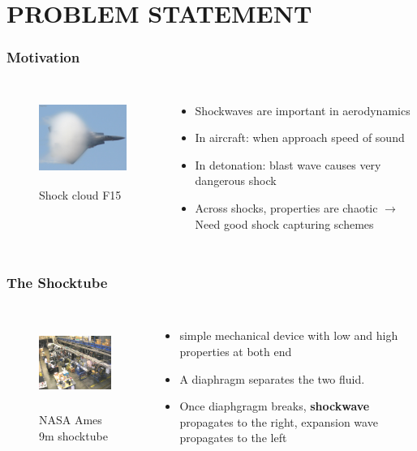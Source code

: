 \documentclass{beamer}
\begin{document}
    \section{PROBLEM STATEMENT}
    \begin{frame}
        \frametitle{Motivation}
        \begin{columns}
        \begin{figure}
            \includegraphics[height = 30mm,width = 50mm]{f15shock.JPG}
            \caption{Shock cloud F15}
        \end{figure}
        

        \begin{itemize}
            \item Shockwaves are important in aerodynamics
            \item In aircraft: when approach speed of sound 
            \item In detonation: blast wave causes very dangerous shock
            \item Across shocks, properties are chaotic $\rightarrow$ Need good shock capturing schemes            
        \end{itemize}
        \end{columns}        
    \end{frame}

    \begin{frame}
        \frametitle{The Shocktube}
        \begin{columns}
            \begin{figure}
                \includegraphics[height = 30mm,width = 50mm]{nasa_shocktube.png}
                \caption{NASA Ames 9m shocktube}
            \end{figure}
    
            \begin{itemize}
                \item simple mechanical device with low and high properties at both end
                \item A diaphragm separates the two fluid. 
                \item Once diaphgragm breaks, \textbf{shockwave} propagates to the right, expansion wave propagates to the left
            \end{itemize}
            \end{columns}        
    \end{frame}
\end{document}
